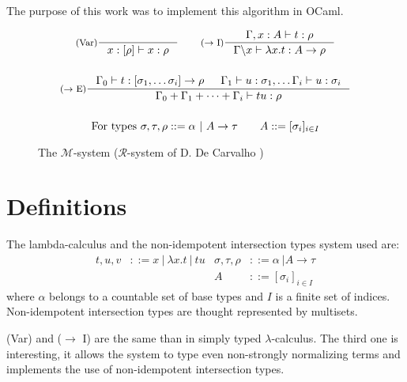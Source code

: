 \documentclass{article}
\newtheorem{Def}{Definition}
\begin{document}
The purpose of this work was to implement this algorithm in OCaml.

\begin{figure}[h]
    \begin{mdframed}
        \begin{gather*}
        \inference[(Var)]{}{x : [\rho] \vdash x : \rho}
        \qquad
        \inference[($\rightarrow$ I)]{\Gamma, x : A \vdash t : \rho}{\Gamma \backslash x \vdash \lambda x.t : A \rightarrow \rho}
        \\ \\
        \inference[($\rightarrow$ E)]{\Gamma_0 \vdash t : [\sigma_1, \ldots \sigma_i] \rightarrow \rho 
            & \Gamma_1 \vdash u : \sigma_1, \ldots \Gamma_i \vdash u : \sigma_i}
        {\Gamma_0 + \Gamma_1 + \cdots + \Gamma_i \vdash tu : \rho}
        \\ \\
        \text{For types } \sigma, \tau, \rho ::= \alpha \ | \ A \rightarrow \tau \qquad A ::= [\sigma_i]_{i \in I}
        \end{gather*}
    \end{mdframed}
    \caption{The  $\mathcal{M}$-system ($\mathcal{R}$-system of D. De Carvalho \cite{DeCarvalho})}
\end{figure}


\section {Definitions}
The lambda-calculus and the non-idempotent intersection types system used are:
\begin{align*}
	t, u, v &::= x\ |\ \lambda x.t\ |\ tu 
	& \sigma, \tau, \rho &::= \alpha \ | A \rightarrow \tau \\
	&& A &::= [\sigma_i]_{i \in I}
\end{align*}
where $\alpha$ belongs to a countable set of base types and $I$ is a finite set of indices. Non-idempotent intersection types are thought represented by multisets.

(Var) and ($\rightarrow$ I) are the same than in simply typed $\lambda$-calculus. The third one is interesting, it allows the system to type even non-strongly normalizing terms and implements the use of non-idempotent intersection types.
\end{document}
